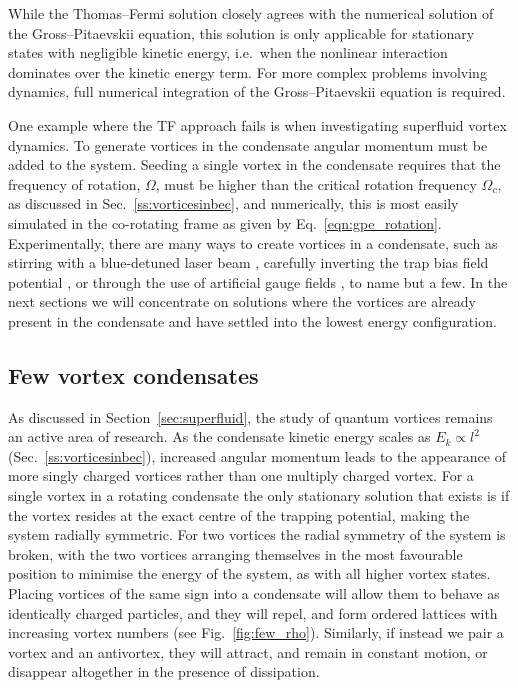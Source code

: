 While the Thomas--Fermi solution closely agrees with the numerical solution of the Gross--Pitaevskii equation, this solution is only applicable for stationary states with negligible kinetic energy, i.e.\ when the nonlinear interaction dominates over the kinetic energy term. For more complex problems involving dynamics, full numerical integration of the Gross--Pitaevskii equation is required.

One example where the TF approach fails is when investigating superfluid vortex dynamics. To generate vortices in the condensate angular momentum must be added to the system. Seeding a single vortex in the condensate requires that the frequency of rotation, $\Omega$, must be higher than the critical rotation frequency $\Omega_c$, as discussed in Sec.~\ref{ss:vorticesinbec}, and numerically, this is most easily simulated in the co-rotating frame as given by Eq.~\eqref{eqn:gpe_rotation}. Experimentally, there are many ways to create vortices in a condensate, such as stirring with a blue-detuned laser beam \cite{Vtx:Raman_prl_2001}, carefully inverting the trap bias field potential \cite{VTX:Nakahara_physb_2000, VTX:Leanhardt_prl_2002, VTX:Kawaguchi_pra_2004_2, VTX:Kuwamoto_jpsj_2010 ,VTX:Masuda_pra_2016}, or through the use of artificial gauge fields \cite{AO:Dalibard_rmp_2011}, to name but a few. In the next sections we will concentrate on solutions where the vortices are already present in the condensate and have settled into the lowest energy configuration.


\subsection{Few vortex condensates}\label{sec:fewvtx}

As discussed in Section~\ref{sec:superfluid}, the study of quantum vortices remains an active area of research. As the condensate kinetic energy scales as $E_k \propto l^2$ (Sec.~\ref{ss:vorticesinbec}), increased angular momentum leads to the appearance of more singly charged vortices rather than one multiply charged vortex. For a single vortex in a rotating condensate the only stationary solution that exists is if the vortex resides at the exact centre of the trapping potential, making the system radially symmetric. For two vortices the radial symmetry of the system is broken, with the two vortices arranging themselves in the most favourable position to minimise the energy of the system, as with all higher vortex states. Placing vortices of the same sign into a condensate will allow them to behave as identically charged particles, and they will repel, and form ordered lattices with increasing vortex numbers (see Fig.~\ref{fig:few_rho}). Similarly, if instead we pair a vortex and an antivortex, they will attract, and remain in constant motion, or disappear altogether in the presence of dissipation.

